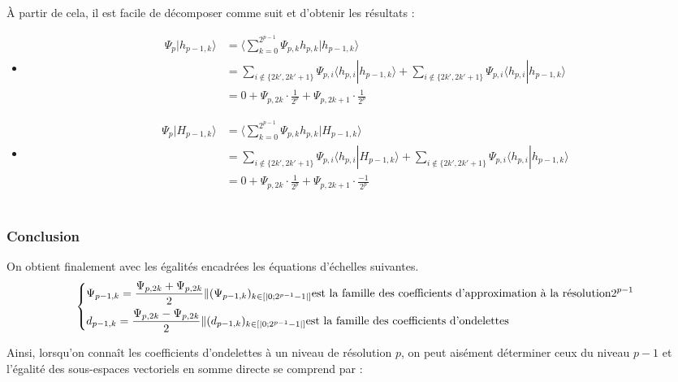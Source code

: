 \documentclass{article}
\begin{document}
\uppercase{à} partir de cela, il est facile de décomposer comme suit et d'obtenir les résultats :

\begin{itemize}
\item \begin{align*}\displaystyle
\Psi{}_{p}|h_{p-1,k}\rangle &=  \langle \sum_{k=0}^{2^{p-1}}\Psi{}_{p,k}h_{p,k}|h_{p-1,k}\rangle \\ &=  \sum_{i\notin{}\{2k',2k'+1\}}\Psi{}_{p,i}\langle{}h_{p,i}|h_{p-1,k}\rangle + \sum_{i\notin{}\{2k',2k'+1\}}\Psi{}_{p,i}\langle{}h_{p,i}|h_{p-1,k}\rangle  \\ 
&= 0 + \Psi{}_{p,2k}\cdot{}\frac{1}{2^p} + \Psi{}_{p,2k+1}\cdot{}\frac{1}{2^p} 
\end{align*} 

\item \begin{align*} \displaystyle
\Psi{}_{p}|H_{p-1,k}\rangle &= \langle \sum_{k=0}^{2^{p-1}}\Psi{}_{p,k}h_{p,k}|H_{p-1,k}\rangle \\ &= 
 \sum_{i\notin{}\{2k',2k'+1\}}\Psi{}_{p,i}\langle{}h_{p,i}|H_{p-1,k}\rangle + \sum_{i\notin{}\{2k',2k'+1\}}\Psi{}_{p,i}\langle{}h_{p,i}|h_{p-1,k}\rangle  \\ 
&= 0 + \Psi{}_{p,2k}\cdot{}\frac{1}{2^p} + \Psi{}_{p,2k+1}\cdot{}\frac{-1}{2^p}
\end{align*} \\


\end{itemize}

\subsubsection{Conclusion}

On obtient finalement avec les égalités encadrées les équations d'échelles suivantes. \\

\[ \begin{dcases} \Psi{}_{p-1,k} = \frac{\Psi{}_{p,2k} + \Psi{}_{p,2k}}{2}  \| (\Psi{}_{p-1,k})_{k\in{}[|0;2^{p-1}-1|]} \text{est la famille des coefficients d'approximation à la résolution} 2^{p-1} \\ 
d_{p-1,k} = \frac{\Psi{}_{p,2k} - \Psi{}_{p,2k}}{2}  \| (d_{p-1,k})_{k\in{}[|0;2^{p-1}-1|]} \text{est la famille des coefficients d'ondelettes}
\end{dcases} \] 

Ainsi, lorsqu’on connaît les coefficients d’ondelettes à un niveau de résolution $p$, on peut aisément déterminer ceux du niveau $p-1$ et l’égalité des sous-espaces vectoriels en somme directe se comprend par :
\end{document}
